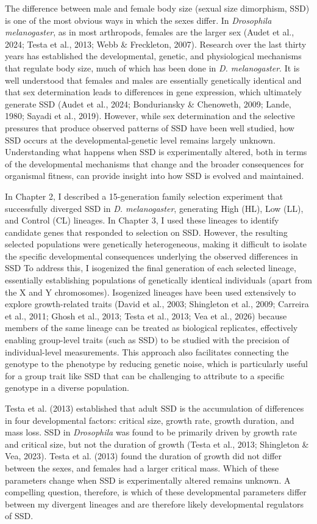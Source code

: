\documentclass[12pt,reqno,oneside]{report}
\begin{document}
The difference between male and female body size (sexual size dimorphism, SSD) is one of the most obvious ways in which the sexes differ. In \textit{Drosophila melanogaster}, as in most arthropods, females are the larger sex (Audet et al., 2024; Testa et al., 2013; Webb \& Freckleton, 2007). Research over the last thirty years has established the developmental, genetic, and physiological mechanisms that regulate body size, much of which has been done in \textit{D. melanogaster}. It is well understood that females and males are essentially genetically identical and that sex determination leads to differences in gene expression, which ultimately generate SSD (Audet et al., 2024; Bonduriansky \& Chenoweth, 2009; Lande, 1980; Sayadi et al., 2019). However, while sex determination and the selective pressures that produce observed patterns of SSD have been well studied, how SSD occurs at the developmental-genetic level remains largely unknown. Understanding what happens when SSD is experimentally altered, both in terms of the developmental mechanisms that change and the broader consequences for organismal fitness, can provide insight into how SSD is evolved and maintained.

In Chapter 2, I described a 15-generation family selection experiment that successfully diverged SSD in \textit{D. melanogaster}, generating High (HL), Low (LL), and Control (CL) lineages. In Chapter 3, I used these lineages to identify candidate genes that responded to selection on SSD. However, the resulting selected populations were genetically heterogeneous, making it difficult to isolate the specific developmental consequences underlying the observed differences in SSD To address this, I isogenized the final generation of each selected lineage, essentially establishing populations of genetically identical individuals (apart from the X and Y chromosomes). Isogenized lineages have been used extensively to explore growth-related traits (David et al., 2003; Shingleton et al., 2009; Carreira et al., 2011; Ghosh et al., 2013; Testa et al., 2013; Vea et al., 2026) because members of the same lineage can be treated as biological replicates, effectively enabling group-level traits (such as SSD) to be studied with the precision of individual-level measurements. This approach also facilitates connecting the genotype to the phenotype by reducing genetic noise, which is particularly useful for a group trait like SSD that can be challenging to attribute to a specific genotype in a diverse population.

Testa et al. (2013) established that adult SSD is the accumulation of differences in four developmental factors: critical size, growth rate, growth duration, and mass loss. SSD in \textit{Drosophila} was found to be primarily driven by growth rate and critical size, but not the duration of growth (Testa et al., 2013; Shingleton \& Vea, 2023). Testa et al. (2013) found the duration of growth did not differ between the sexes, and females had a larger critical mass. Which of these parameters change when SSD is experimentally altered remains unknown. A compelling question, therefore, is which of these developmental parameters differ between my divergent lineages and are therefore likely developmental regulators of SSD.
\end{document}
